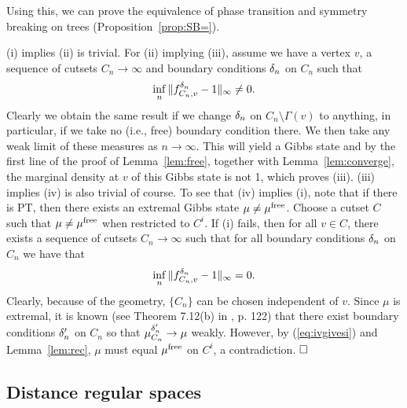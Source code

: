 Using this, we can prove the equivalence of phase transition and
symmetry breaking on trees (Proposition~\ref{prop:SB=}).

(i) implies (ii) is trivial. For (ii) implying (iii), assume we have
a vertex $v$, a sequence of cutsets $C_n\to\infty$ and boundary 
conditions $\delta_n$ on $C_n$ such that
$$
\inf_n \|f_{C_n,v}^{\delta_n}-1\|_\infty \neq 0.
$$
Clearly we obtain the same result if we change $\delta_n$ on 
$C_n\setminus \Gamma(v)$ to anything, in particular, if we take no (i.e., 
free) boundary condition there. We then take any weak limit of these 
measures as $n\to\infty$. This will yield a Gibbs state and by the first line
of the proof of Lemma~\ref{lem:free}, together with 
Lemma~\ref{lem:converge},
the marginal density at $v$ of this Gibbs state is not 1, which proves (iii).
(iii) implies (iv) is also trivial of course. To see that (iv) implies (i),
note that if there is PT, then there exists an extremal Gibbs state 
$\mu\neq \mu^{\rm free}$. Choose a cutset $C$ such that
$\mu\neq \mu^{\rm free}$ when restricted to $C^i$. If (i) fails, then for all
$v\in C$, there exists a
sequence of cutsets $C_n\to\infty$ such that for all boundary 
conditions $\delta_n$ on $C_n$ we have that
\begin{equation} \label{eq:ivgivesi}
\inf_n \|f_{C_n,v}^{\delta_n}-1\|_\infty = 0.
\end{equation} 
Clearly, because of the geometry, $\{C_n\}$ can be chosen independent of $v$. 
Since $\mu$ is extremal, it is known (see Theorem 7.12(b) in \cite{Ge}, p. 122)
that there exist boundary conditions
$\delta_n'$ on $C_n$ so that $\mu_{C_n}^{\delta_n'} \rightarrow \mu$ weakly.
However, by (\ref{eq:ivgivesi}) and Lemma~\ref{lem:rec}, $\mu$ must equal
$\mu^{\rm free}$ on $C^i$, a contradiction. $\qed$

\subsection{Distance regular spaces} \label{sub:drs}

